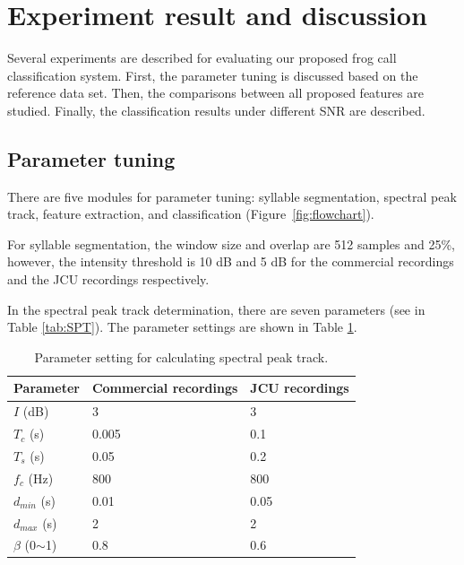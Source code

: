 %


\section{Experiment result and discussion}
Several experiments are described for evaluating our proposed frog call classification system. First, the parameter tuning is discussed based on the reference data set. Then, the comparisons between all proposed features are studied. Finally, the classification results under different SNR are described.

\subsection{Parameter tuning}
There are five modules for parameter tuning: syllable segmentation, spectral peak track, feature extraction, and classification (Figure~\ref{fig:flowchart}). 

For syllable segmentation, the window size and overlap are 512 samples and 25\%, however, the intensity threshold is 10 dB and 5 dB for the commercial recordings and the JCU recordings respectively.


In the spectral peak track determination, there are seven parameters (see in Table \ref{tab:SPT}). The parameter settings are shown in Table \ref{tab:value}.
\begin{table}[htb!]
\centering
\caption{Parameter setting for calculating spectral peak track.}
\label{tab:value}
\begin{tabular}{lll}
\hline
\textbf{Parameter} & \textbf{Commercial recordings} & \textbf{JCU recordings} \\ \hline\hline
   $I$ (dB)        & 3             & 3             \\ 
    $T_{c}$ (s)        & 0.005         & 0.1           \\ 
  $T_{s}$ (s)        & 0.05          & 0.2           \\ 
      $f_{c}$ (Hz)        & 800           & 800           \\ 
   $d_{min}$ (s)         & 0.01          & 0.05          \\ 
     $d_{max}$ (s)        & 2             & 2             \\ 
     $\beta$ (0$\sim$1)          & 0.8           & 0.6           \\ \hline\hline
\end{tabular}
\end{table}
                              

